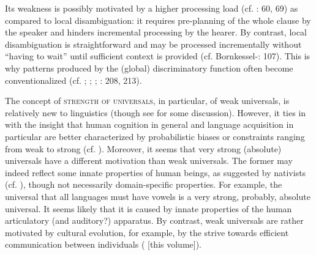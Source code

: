 \documentclass[output=paper]{langsci/langscibook}
\begin{document}
Its weakness is possibly motivated by a higher processing load (cf. \citealt{Hawkins2014}: 60, 69) as compared to local disambiguation: it requires pre-planning of the whole clause by the speaker and hinders incremental processing by the hearer. By contrast, local disambiguation is straightforward and may be processed incrementally without “having to wait” until sufficient context is provided (cf. Bornkessel-\citealt{SchlesewskySchlesewsky2014}: 107). This is why patterns produced by the (global) discriminatory function often become conventionalized (cf. \citealt{Aissen2003}; \citealt{ZeevatJäger2002}; \citealt{Jäger2004}; \citealt{Malchukov2008}: 208, 213).

The concept of \textsc{strength of universals}, in particular, of weak universals, is relatively new to linguistics (though see \citealt{Bickel2013} for some discussion). However, it ties in with the insight that human cognition in general and language acquisition in particular are better characterized by probabilistic biases or constraints ranging from weak to strong (cf. \citealt{ThompsonEtAl2016}). Moreover, it seems that very strong (absolute) universals have a different motivation than weak universals. The former may indeed reflect some innate properties of human beings, as suggested by nativists (cf. \citealt{Chomsky1965}), though not necessarily domain-specific properties. For example, the universal that all languages must have vowels \citep[19]{Comrie1989} is a very strong, probably, absolute universal. It seems likely that it is caused by innate properties of the human articulatory (and auditory?) apparatus. By contrast, weak universals are rather motivated by cultural evolution, for example, by the strive towards efficient communication between individuals (\citealt{Haspelmath2018} [this volume]). 
\end{document}
